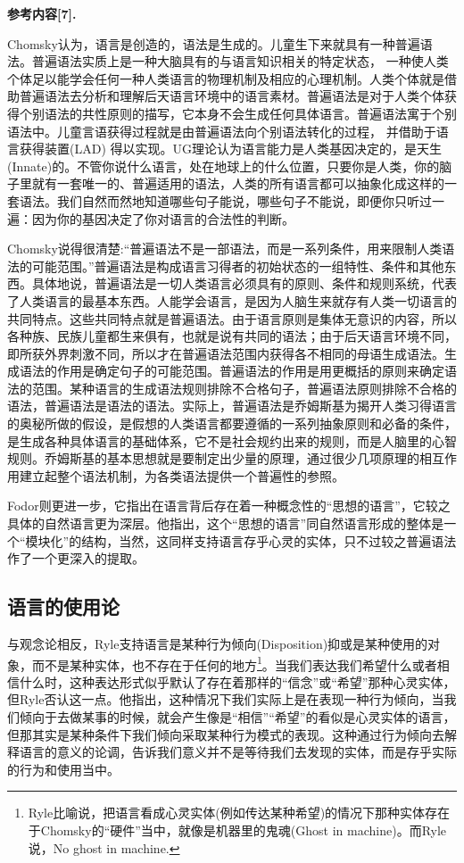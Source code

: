 \documentclass{article}
\begin{document}
\textbf{\kaishu 参考内容[7].}
{
Chomsky认为，语言是创造的，语法是生成的。儿童生下来就具有一种普遍语法。普遍语法实质上是一种大脑具有的与语言知识相关的特定状态， 一种使人类个体足以能学会任何一种人类语言的物理机制及相应的心理机制。人类个体就是借助普遍语法去分析和理解后天语言环境中的语言素材。普遍语法是对于人类个体获得个别语法的共性原则的描写，它本身不会生成任何具体语言。普遍语法寓于个别语法中。儿童言语获得过程就是由普遍语法向个别语法转化的过程， 并借助于语言获得装置(LAD) 得以实现。UG理论认为语言能力是人类基因决定的，是天生(Innate)的。不管你说什么语言，处在地球上的什么位置，只要你是人类，你的脑子里就有一套唯一的、普遍适用的语法，人类的所有语言都可以抽象化成这样的一套语法。我们自然而然地知道哪些句子能说，哪些句子不能说，即便你只听过一遍：因为你的基因决定了你对语言的合法性的判断。

Chomsky说得很清楚:“普遍语法不是一部语法，而是一系列条件，用来限制人类语法的可能范围。”普遍语法是构成语言习得者的初始状态的一组特性、条件和其他东西。具体地说，普遍语法是一切人类语言必须具有的原则、条件和规则系统，代表了人类语言的最基本东西。人能学会语言，是因为人脑生来就存有人类一切语言的共同特点。这些共同特点就是普遍语法。由于语言原则是集体无意识的内容，所以各种族、民族儿童都生来俱有，也就是说有共同的语法；由于后天语言环境不同，即所获外界刺激不同，所以才在普遍语法范围内获得各不相同的母语生成语法。生成语法的作用是确定句子的可能范围。普遍语法的作用是用更概括的原则来确定语法的范围。某种语言的生成语法规则排除不合格句子，普遍语法原则排除不合格的语法，普遍语法是语法的语法。实际上，普遍语法是乔姆斯基为揭开人类习得语言的奥秘所做的假设，是假想的人类语言都要遵循的一系列抽象原则和必备的条件，是生成各种具体语言的基础体系，它不是社会规约出来的规则，而是人脑里的心智规则。乔姆斯基的基本思想就是要制定出少量的原理，通过很少几项原理的相互作用建立起整个语法机制，为各类语法提供一个普遍性的参照。}

Fodor则更进一步，它指出在语言背后存在着一种概念性的“思想的语言”，它较之具体的自然语言更为深层。他指出，这个“思想的语言”同自然语言形成的整体是一个“模块化”的结构，当然，这同样支持语言存乎心灵的实体，只不过较之普遍语法作了一个更深入的提取。
\subsection{语言的使用论}
与观念论相反，Ryle支持语言是某种行为倾向(Disposition)抑或是某种使用的对象，而不是某种实体，也不存在于任何的地方\footnote{Ryle比喻说，把语言看成心灵实体(例如传达某种希望)的情况下那种实体存在于Chomsky的“硬件”当中，就像是机器里的鬼魂(Ghost in machine)。而Ryle说，No ghost in machine.}。当我们表达我们希望什么或者相信什么时，这种表达形式似乎默认了存在着那样的“信念”或“希望”那种心灵实体，但Ryle否认这一点。他指出，这种情况下我们实际上是在表现一种行为倾向，当我们倾向于去做某事的时候，就会产生像是“相信”“希望”的看似是心灵实体的语言，但那其实是某种条件下我们倾向采取某种行为模式的表现。这种通过行为倾向去解释语言的意义的论调，告诉我们意义并不是等待我们去发现的实体，而是存乎实际的行为和使用当中。
\end{document}
